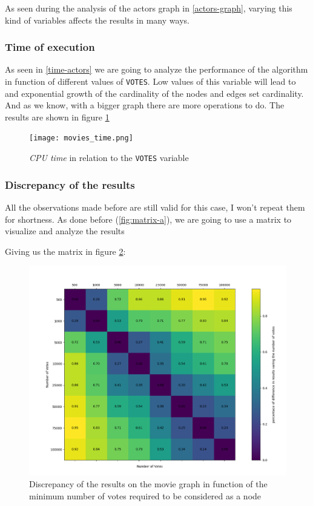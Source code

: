 As seen during the analysis of the actors graph in \ref{actors-graph}, varying this kind of variables affects the results in many ways.

\subsubsection{Time of execution}

As seen in \ref{time-actors} we are going to analyze the performance of the algorithm in function of different values of \texttt{VOTES}. Low values of this variable will lead to and exponential growth of the cardinality of the nodes and edges set cardinality. And as we know, with a bigger graph there are more operations to do. The results are shown in figure \ref{fig:moves_time}

\begin{figure}[h!]
    \centering
    \texttt{[image: movies\_time.png]}
    \caption{\emph{CPU time} in relation to the \texttt{VOTES} variable}
    \label{fig:moves_time}
\end{figure}

\newpage


\subsubsection{Discrepancy of the results}

All the observations made before are still valid for this case, I won't repeat them for shortness. As done before (\ref{fig:matrix-a}), we are going to use a matrix to visualize and analyze the results
\s

% 

\nd Giving us the matrix in figure \ref{fig:matrix-b}:
\begin{figure}[H]
    \centering
    \includegraphics[width=13cm]{Figure_2.png}
    \caption{Discrepancy of the results on the movie graph in function of the minimum number of votes required to be considered as a node}
    \label{fig:matrix-b}
\end{figure}
\newpage


